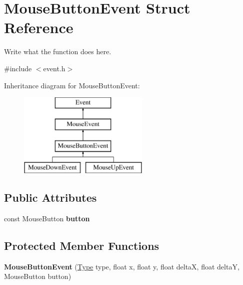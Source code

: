 \hypertarget{structMouseButtonEvent}{\section{Mouse\+Button\+Event Struct Reference}
\label{structMouseButtonEvent}
}


Write what the function does here.  




{\ttfamily \#include $<$event.\+h$>$}

Inheritance diagram for Mouse\+Button\+Event\+:\begin{figure}[H]
\begin{center}
\leavevmode
\includegraphics[height=4.000000cm]{structMouseButtonEvent}
\end{center}
\end{figure}
\subsection*{Public Attributes}
\begin{DoxyCompactItemize}
\item 
\hypertarget{structMouseButtonEvent_a91b45a7119f6cae5454b083b9c1d99c1}{const Mouse\+Button {\bfseries button}}\label{structMouseButtonEvent_a91b45a7119f6cae5454b083b9c1d99c1}

\end{DoxyCompactItemize}
\subsection*{Protected Member Functions}
\begin{DoxyCompactItemize}
\item 
\hypertarget{structMouseButtonEvent_a1dd634033a88534d5bedb2dee0f4299a}{{\bfseries Mouse\+Button\+Event} (\hyperlink{classEvent_a2abf13b5be49315e9e362af02029f058}{Type} type, float x, float y, float delta\+X, float delta\+Y, Mouse\+Button button)}\label{structMouseButtonEvent_a1dd634033a88534d5bedb2dee0f4299a}

\end{DoxyCompactItemize}
